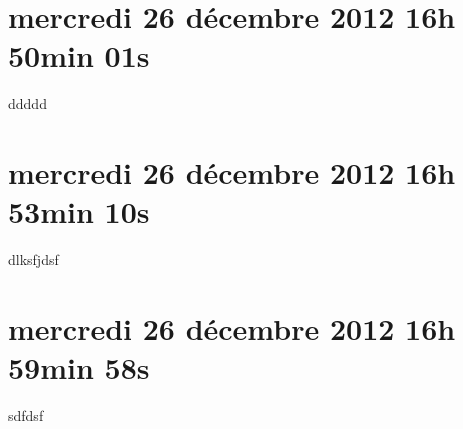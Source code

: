 
\section{mercredi 26 décembre 2012 16h 50min 01s}

ddddd

\section{mercredi 26 décembre 2012 16h 53min 10s}

dlksfjdsf

\section{mercredi 26 décembre 2012 16h 59min 58s}

sdfdsf
